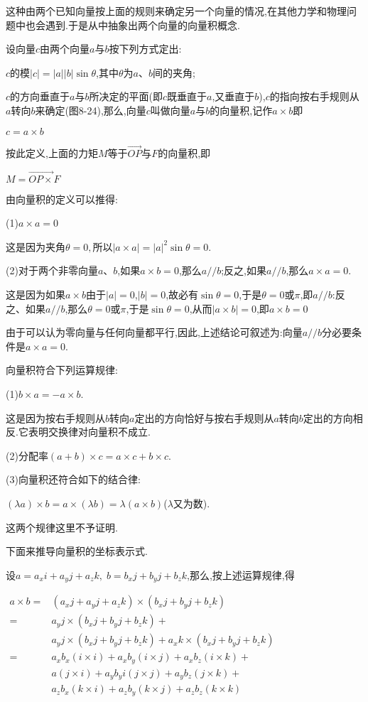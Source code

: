 \documentclass[oneside]{book}
\begin{document}
这种由两个已知向量按上面的规则来确定另一个向量的情况,在其他力学和物理问题中也会遇到.于是从中抽象出两个向量的向量积概念.

设向量$c$由两个向量$a$与$b$按下列方式定出:

$c$的模$|c| = |a||b|{{\sin}}\theta $,其中$\theta $为$a$、$b$间的夹角; 

$c$的方向垂直于$a$与$b$所决定的平面(即$c$既垂直于$a$,又垂直于$b$),$c$的指向按右手规则从$a$转向$b$来确定(图8-24),那么,向量$c$叫做向量$a$与$b$的向量积,记作$a \times b$即

$c = a \times b$

按此定义,上面的力矩$M$等于$\overrightarrow {OP} $与$F$的向量积,即

$M = \overrightarrow {OP \times } F$

由向量积的定义可以推得:

(1)$a \times a = 0$

这是因为夹角$\theta  = 0,$所以$\left| {a \times a} \right| = {\left| a \right|^2}{{\sin}}\theta  = 0$.

(2)对于两个非零向量$a$、$b$,如果$a \times b = 0$,那么$a//b$;反之,如果$a//b$,那么$a \times a = 0$.

这是因为如果$a \times b$由于$|a| = 0$,$|b| = 0$,故必有${{\sin}}\theta  = 0$,于是$\theta  = 0$或$\pi $,即$a//b$:反之、如果$a//b$,那么$\theta  = 0$或$\pi $,于是${{\sin}}\theta  = 0$,从而$|a \times b| = 0$,即$a \times b = 0$

由于可以认为零向量与任何向量都平行,因此,上述结论可叙述为:向量$a//b$分必要条件是$a \times a = 0$.

向量积符合下列运算规律:

(1)$b \times a =  - a \times b$.

这是因为按右手规则从$b$转向$a$定出的方向恰好与按右手规则从$a$转向$b$定出的方向相反.它表明交换律对向量积不成立.

(2)分配率$\left( {a + b} \right) \times c = a \times c + b \times c$.

(3)向量积还符合如下的结合律:

$(\lambda a) \times b = a \times (\lambda b) = \lambda (a \times b)$($\lambda$又为数).

这两个规律这里不予证明.

下面来推导向量积的坐标表示式.

设$a = {a_x}i + {a_y}j + {a_z}k,\;b = {b_x}j + {b_y}j + {b_z}k$,那么,按上述运算规律,得

$\begin{aligned} a \times b=&\left(a_{x} j+a_{y} j+a_{z} k\right) \times\left(b_{x} j+b_{y} j+b_{z} k\right) \\=& a_{y} j \times\left(b_{x} j+b_{y} j+b_{z} k\right)+\\ & a_{y} j \times\left(b_{x} j+b_{y} j+b_{z} k\right)+a_{x} k \times\left(b_{x} j+b_{y} j+b_{z} k\right) \\=& a_{x} b_{x}(i \times i)+a_{x} b_{y}(i \times j)+a_{x} b_{z}(i \times k)+\\ & a(j \times i)+a_{y} b_{y} i(j \times j)+a_{y} b_{z}(j \times k)+\\ & a_{z} b_{x}(k \times i)+a_{z} b_{y}(k \times j)+a_{z} b_{z}(k \times k) \end{aligned}$
\end{document}

